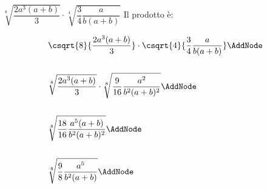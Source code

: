 \begin{exercise}
	$\sqrt[8]{\dfrac{2a^3(a+b)}{3}}\cdot\sqrt[4]{\dfrac{3}{4}\dfrac{a}{b(a+b)}}$
	\tcblower
	Il prodotto è:
	\begin{NodesList}
		\begin{align*}
			&\csqrt{8}{\dfrac{2a^3(a+b)}{3}}\cdot\csqrt{4}{\dfrac{3}{4}\dfrac{a}{b(a+b)}}\AddNode\\
			&\\
			&\sqrt[8]{\dfrac{2a^3(a+b)}{3}}\cdot\sqrt[8]{\dfrac{9}{16}\dfrac{a^2}{b^2(a+b)^2}}\AddNode\\
			&\\
			&\sqrt[8]{\dfrac{18}{16}\dfrac{a^5(a+b)}{b^2(a+b)^2}}\AddNode\\
			&\\
			&\sqrt[8]{\dfrac{9}{8}\dfrac{a^5}{b^2(a+b)}}\AddNode\\
		\end{align*}
					
				\end{NodesList}
			\end{exercise}
			
